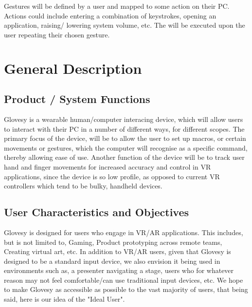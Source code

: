 \documentclass[12pt,a4paper,oneside]{book}
\theoremstyle{plain}
\numberwithin{equation}{chapter}
\newcounter{Chapnum}
\newcounter{Secnum}
\begin{document}
\vspace{1cm}

\noindent Gestures will be defined by a user and mapped to some action on their PC. Actions could include entering a combination of keystrokes, opening an application, raising/ lowering system volume, etc. The will be executed upon the user repeating their chosen gesture.

\vspace{1cm}


\chapter*{General Description}

\section{Product / System Functions}

\noindent Glovesy is a wearable human/computer interacing device, which will allow users to interact with their PC in a number of different ways, for different scopes.  The primary focus of the device, will be to allow the user to set up macros, or certain movements or gestures, which the computer will recognise as a specific command, thereby allowing ease of use. Another function of the device will be to track user hand and finger movements for increased accuracy and control in VR applications, since the device is so low profile, as opposed to current VR controllers which tend to be bulky, handheld devices.

\section{User Characteristics and Objectives}

\noindent Glovesy is designed for users who engage in VR/AR applications. This includes, but is not limited to, Gaming, Product prototyping across remote teams,  Creating virtual art, etc. In addition to VR/AR users, given that Glovesy is designed to be a standard input device, we also envision it being used in environments such as,  a presenter navigating a stage, users who for whatever reason may not feel comfortable/can use traditional input devices, etc. We hope to make Glovesy as accessible as possible to the vast majority of users, that being said, here is our idea of the "Ideal User".
\end{document}
